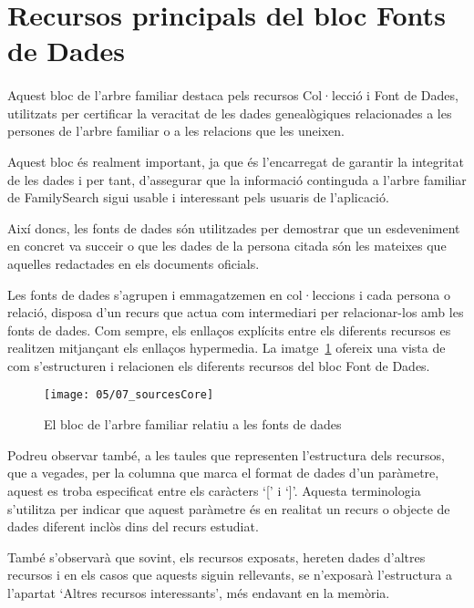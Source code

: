 \section{Recursos principals del bloc Fonts de Dades}

    \paragraph{}
    Aquest bloc de l'arbre familiar destaca pels recursos Col·lecció i Font de Dades, utilitzats per certificar la veracitat de les dades genealògiques relacionades a les persones de l'arbre familiar o a les relacions que les uneixen.

    Aquest bloc és realment important, ja que és l'encarregat de garantir la integritat de les dades i per tant, d'assegurar que la informació continguda a l'arbre familiar de FamilySearch sigui usable i interessant pels usuaris de l'aplicació.

    Així doncs, les fonts de dades són utilitzades per demostrar que un esdeveniment en concret va succeir o que les dades de la persona citada són les mateixes que aquelles redactades en els documents oficials.

    Les fonts de dades s'agrupen i emmagatzemen en col·leccions i cada persona o relació, disposa d'un recurs que actua com intermediari per relacionar-los amb les fonts de dades. Com sempre, els enllaços explícits entre els diferents recursos es realitzen mitjançant els enllaços hypermedia. La imatge~\ref{img:sourcesBloc} ofereix una vista de com s'estructuren i relacionen els diferents recursos del bloc Font de Dades.

    \begin{figure}[h]
        \texttt{[image: 05/07\_sourcesCore]}
        \centering
        \caption{El bloc de l'arbre familiar relatiu a les fonts de dades}\label{img:sourcesBloc}
    \end{figure}

    Podreu observar també, a les taules que representen l'estructura dels recursos, que a vegades, per la columna que marca el format de dades d'un paràmetre, aquest es troba especificat entre els caràcters `[' i `]'. Aquesta terminologia s'utilitza per indicar que aquest paràmetre és en realitat un recurs o objecte de dades diferent inclòs dins del recurs estudiat.

    També s'observarà que sovint, els recursos exposats, hereten dades d'altres recursos i en els casos que aquests siguin rellevants, se n'exposarà l'estructura a l'apartat `Altres recursos interessants', més endavant en la memòria.

    
    
    
    
    
